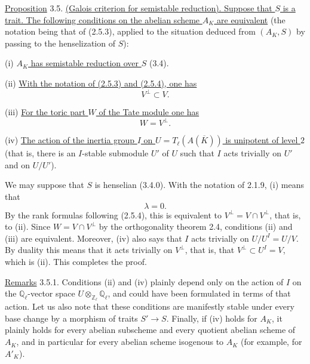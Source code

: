 
\medskip
\noindent
\underline{Proposition} 3.5. \underline{(Galois criterion for semistable
reduction).  Suppose that $S$ is a trait.  The following conditions on the
abelian scheme $A_K$ are equivalent} (the notation being that of (2.5.3),
applied to the situation deduced from $(A_K,S)$ by passing to the
henselization of $S$):

\smallskip
\noindent
(i) \underline{$A_K$ has semistable reduction over $S$} (3.4).

\smallskip
\noindent
(ii) \underline{With the notation of (2.5.3) and (2.5.4), one has}
\[
 V^\perp\subset V.
\]

\noindent
(iii) \underline{For the toric part $W$ of the Tate module one has}
\[
 W=V^\perp.
\]

\noindent
(iv) \underline{The action of the inertia group $I$ on
$U=T_\ell(A(\overline K))$ is unipotent of level $2$} (that is, there is an
$I$-stable submodule $U'$ of $U$ such that $I$ acts trivially on $U'$ and
on $U/U'$).

We may suppose that $S$ is henselian (3.4.0).  With the notation of 2.1.9,
(i) means that
\[
 \lambda=0.
\]
By the rank formulas following (2.5.4), this is equivalent to
$V^\perp=V\cap V^\perp$, that is, to (ii).  Since
$W=V\cap V^\perp$ by the orthogonality theorem 2.4, conditions (ii) and
(iii) are equivalent.  Moreover, (iv) also says that $I$ acts trivially
on $U/U^I=U/V$.  By duality this means that it acts trivially on
$V^\perp$, that is, that $V^\perp\subset U^I=V$, which is (ii).  This
completes the proof.

\medskip
\noindent
\underline{Remarks} 3.5.1.  Conditions (ii) and (iv) plainly depend only
on the action of $I$ on the $\mathbb Q_\ell$-vector space
$U\otimes_{\mathbb Z_\ell}\mathbb Q_\ell$, and could have been formulated
in terms of that action.  Let us also note that these conditions are
manifestly stable under every base change by a morphism of traits
$S'\longrightarrow S$.  Finally, if (iv) holds for $A_K$, it plainly holds
for every abelian subscheme and every quotient abelian scheme of $A_K$,
and in particular for every abelian scheme isogenous to $A_K$ (for
example, for $A'_K$).

